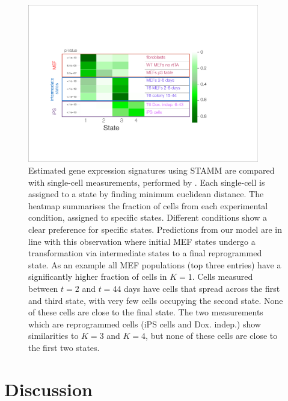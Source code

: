 \begin{figure}
  \centering
  \includegraphics[width=0.9\textwidth]{pics/Heat_single_cells.pdf}
  \caption{Estimated gene expression signatures using STAMM are compared with single-cell measurements, performed by \cite{Buganim:2012hp}. Each single-cell is assigned to a state by finding minimum euclidean distance. The heatmap summarises the fraction of cells from each experimental condition, assigned to specific states. Different conditions show a clear preference for specific states. Predictions from our model are in line with this observation where initial MEF states undergo a transformation via intermediate states to a final reprogrammed state. As an example all MEF populations (top three entries) have a significantly higher fraction of cells in $K=1$. Cells measured between $t=2$ and $t=44$ days have cells that spread across the first and third state, with very few cells occupying the second state. None of these cells are close to the final state. The two measurements which are reprogrammed cells (iPS cells and Dox. indep.) show similarities to $K=3$ and $K=4$, but none of these cells are close to the first two states.
}
  \label{fig:buganim-heat}
\end{figure}

\section{Discussion}
\label{sec:discussion-ips}

